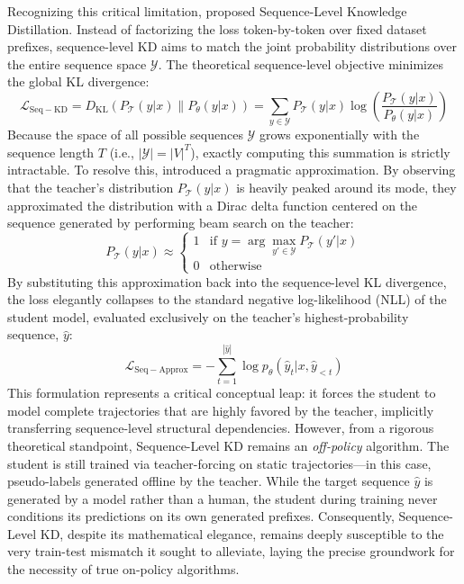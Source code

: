 \documentclass{article} %
\newcommand{\KL}{D_{\mathrm{KL}}}
\newcommand{\ptheta}{p_\theta}
\newcommand{\loss}{\mathcal{L}}
\begin{document}
Recognizing this critical limitation, \citet{kim2016sequence} proposed Sequence-Level Knowledge Distillation. Instead of factorizing the loss token-by-token over fixed dataset prefixes, sequence-level KD aims to match the joint probability distributions over the entire sequence space $\mathcal{Y}$. The theoretical sequence-level objective minimizes the global KL divergence:
\begin{equation}
    \loss_{\mathrm{Seq-KD}} = \KL(P_{\mathcal{T}}(y | x) \parallel P_{\theta}(y | x)) = \sum_{y \in \mathcal{Y}} P_{\mathcal{T}}(y | x) \log \left( \frac{P_{\mathcal{T}}(y | x)}{P_{\theta}(y | x)} \right)
\end{equation}
Because the space of all possible sequences $\mathcal{Y}$ grows exponentially with the sequence length $T$ (i.e., $|\mathcal{Y}| = |V|^T$), exactly computing this summation is strictly intractable. To resolve this, \citet{kim2016sequence} introduced a pragmatic approximation. By observing that the teacher's distribution $P_{\mathcal{T}}(y|x)$ is heavily peaked around its mode, they approximated the distribution with a Dirac delta function centered on the sequence generated by performing beam search on the teacher:
\begin{equation}
    P_{\mathcal{T}}(y | x) \approx \begin{cases} 
      1 & \text{if } y = \arg\max_{y' \in \mathcal{Y}} P_{\mathcal{T}}(y' | x) \\
      0 & \text{otherwise} 
   \end{cases}
\end{equation}
By substituting this approximation back into the sequence-level KL divergence, the loss elegantly collapses to the standard negative log-likelihood (NLL) of the student model, evaluated exclusively on the teacher's highest-probability sequence, $\hat{y}$:
\begin{equation}
    \loss_{\mathrm{Seq-Approx}} = - \sum_{t=1}^{|\hat{y}|} \log \ptheta(\hat{y}_t | x, \hat{y}_{<t})
\end{equation}
This formulation represents a critical conceptual leap: it forces the student to model complete trajectories that are highly favored by the teacher, implicitly transferring sequence-level structural dependencies. However, from a rigorous theoretical standpoint, Sequence-Level KD remains an \textit{off-policy} algorithm. The student is still trained via teacher-forcing on static trajectories—in this case, pseudo-labels generated offline by the teacher. While the target sequence $\hat{y}$ is generated by a model rather than a human, the student during training never conditions its predictions on its own generated prefixes. Consequently, Sequence-Level KD, despite its mathematical elegance, remains deeply susceptible to the very train-test mismatch it sought to alleviate, laying the precise groundwork for the necessity of true on-policy algorithms.
\end{document}
